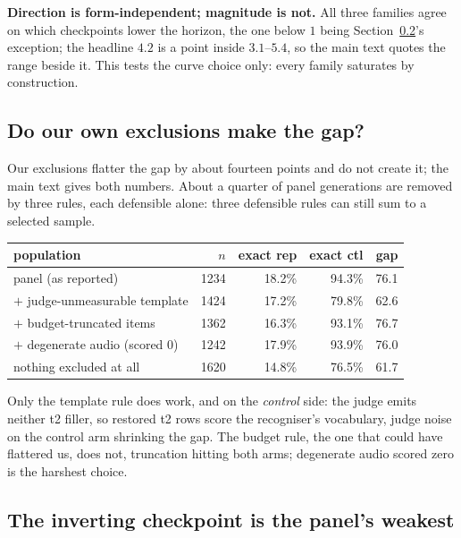 \noindent\textbf{Direction is form-independent; magnitude is not.} All three families agree on
which checkpoints lower the horizon, the one below $1$ being Section~\ref{sec:weakest}'s
exception; the headline $4.2$ is a point inside $3.1$--$5.4$, so the main text quotes the range
beside it. This tests the curve choice only: every family saturates by construction.

\subsection{Do our own exclusions make the gap?}
\label{sec:exclusions}

Our exclusions flatter the gap by about fourteen points and do not create it; the main text
gives both numbers. About a quarter of panel generations are removed by three rules, each
defensible alone: three defensible rules can still sum to a selected sample.

\begin{center}
\begin{tabular}{lrrrr}
\toprule
population & $n$ & exact rep & exact ctl & gap \\
\midrule
panel (as reported)   & 1234 & 18.2\% & 94.3\% & 76.1 \\
$+$ judge-unmeasurable template & 1424 & 17.2\% & 79.8\% & 62.6 \\
$+$ budget-truncated items & 1362 & 16.3\% & 93.1\% & 76.7 \\
$+$ degenerate audio (scored 0) & 1242 & 17.9\% & 93.9\% & 76.0 \\
nothing excluded at all & 1620 & 14.8\% & 76.5\% & 61.7 \\
\bottomrule
\end{tabular}
\end{center}

\noindent Only the template rule does work, and on the \emph{control} side: the judge emits
neither t2 filler, so restored t2 rows score the recogniser's vocabulary, judge noise on the
control arm shrinking the gap. The budget rule, the one that could have flattered us, does not,
truncation hitting both arms; degenerate audio scored zero is the harshest choice.

\subsection{The inverting checkpoint is the panel's weakest}
\label{sec:weakest}

